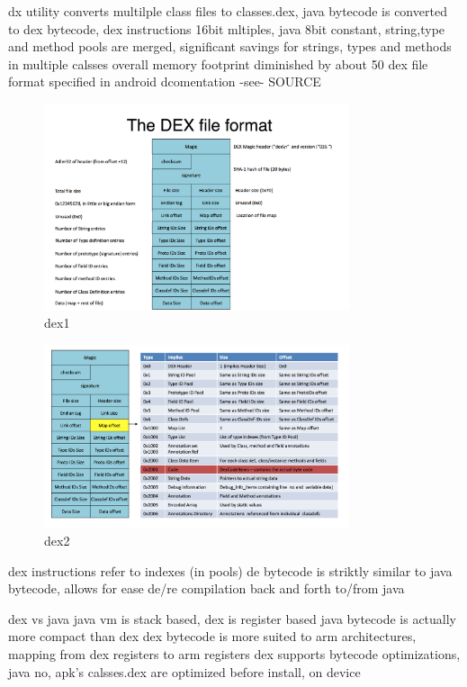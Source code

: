 %
dx utility converts multilple class files to classes.dex, java bytecode is converted to dex bytecode, dex instructions 16bit mltiples, java 8bit
constant, string,type and method pools are merged, significant savings for strings, types and methods in multiple calsses
overall memory footprint diminished by about 50%
dex file format specified in android dcomentation -see- SOURCE\newline
\begin{figure}[h]
    \centering
    \includegraphics[width=0.8\textwidth]{data/dex1.png}
    \caption{dex1}
    \label{fig:dex1}
\end{figure}
\begin{figure}[h]
    \centering
    \includegraphics[width=0.8\textwidth]{data/dex2.png}
    \caption{dex2}
    \label{fig:dex2}
\end{figure}
dex instructions refer to indexes (in pools)\newline
de bytecode is striktly similar to java bytecode, allows for ease de/re compilation back and forth to/from java\newline

dex vs java\newline
java vm is stack based, dex is register based
java bytecode is actually more compact than dex
dex bytecode is more suited to arm architectures, mapping from dex registers to arm registers
dex supports bytecode optimizations, java no, apk's calsses.dex are optimized before install, on device\newline
\cite{andevconDalvikART}
%


